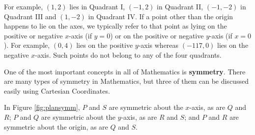 For example, $(1,2)$ lies in Quadrant I, $(-1,2)$ in Quadrant II, $(-1,-2)$ in Quadrant III and $(1,-2)$ in Quadrant IV.  If a point other than the origin happens to lie on the axes, we typically refer to that point as lying on the positive or negative $x$-axis (if $y = 0$) or on the positive or negative $y$-axis (if $x = 0$).  For example, $(0,4)$ lies on the positive $y$-axis whereas $(-117,0)$ lies on the negative $x$-axis.  Such points do not belong to any of the four quadrants.

\smallskip

One of the most important concepts in all of Mathematics is \textbf{symmetry}. There are many types of symmetry in Mathematics, but three of them can be discussed easily using Cartesian Coordinates.

\medskip


\pagebreak



In Figure \ref{fig:plansymm}, $P$ and $S$ are symmetric about the $x$-axis, as are $Q$ and $R$;  $P$ and $Q$ are symmetric about the $y$-axis, as are $R$ and $S$;  and $P$ and $R$ are symmetric about the origin, as are $Q$ and $S$.


\medskip

